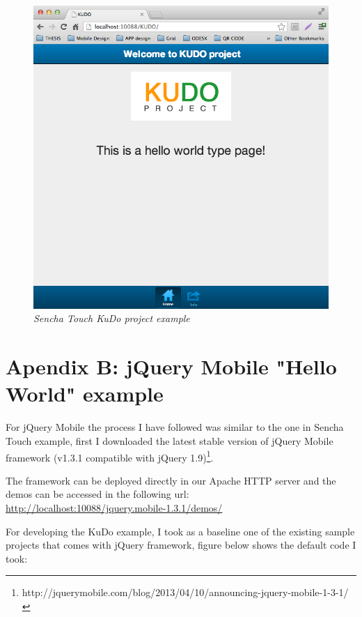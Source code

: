 \documentclass[a4paper,12pt]{book}
\begin{document}
\begin{figure}[H]
    \centering
    \includegraphics[width=12cm, keepaspectratio]{img/sencha4.png}
    \caption{\textit{Sencha Touch KuDo project example}}
 \end{figure}

\chapter{Apendix B: jQuery Mobile "Hello World" example}
\label{Apendix B: jQuery Mobile "Hello World" example}

For jQuery Mobile the process I have followed was similar to the one in Sencha Touch example, first I downloaded the latest stable version of jQuery Mobile framework (v1.3.1 compatible with jQuery 1.9)\footnote{http://jquerymobile.com/blog/2013/04/10/announcing-jquery-mobile-1-3-1/}.

The framework can be deployed directly in our Apache HTTP server and the demos can be accessed in the following url:\\

\url{http://localhost:10088/jquery.mobile-1.3.1/demos/}

For developing the KuDo example, I took as a baseline one of the existing sample projects that comes with jQuery framework, figure below shows the default code I took:
\end{document}
